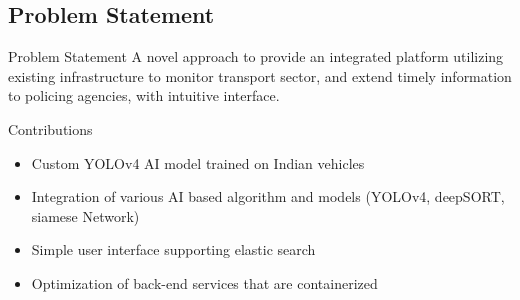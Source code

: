 \documentclass{beamer}
\begin{document}

	\subsection{Problem Statement}
	\begin{frame}{Problem Statement}
		A novel approach to provide an integrated platform utilizing existing infrastructure to monitor transport sector, and extend timely information to policing agencies, with intuitive interface.
	\end{frame}

	\begin{frame}{Contributions}
		\begin{itemize}
			\item Custom YOLOv4 AI model trained on Indian vehicles
			\item Integration of various AI based algorithm and models (YOLOv4, deepSORT, siamese Network)
			\item Simple user interface supporting elastic search
			\item Optimization of back-end services that are containerized 
		\end{itemize}
	\end{frame}
	
\end{document}
